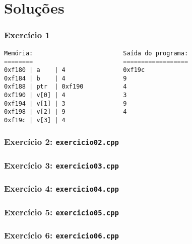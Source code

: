 \documentclass[aspectratio=169]{beamer}
\begin{document}
\section{Soluções}

\begin{frame}[fragile]\frametitle{Exercício 1}
\begin{lstlisting}[language={}]
Memória:                         Saída do programa:
========                         ==================
0xf180 | a    | 4                0xf19c
0xf184 | b    | 4                9
0xf188 | ptr  | 0xf190           4
0xf190 | v[0] | 4                3
0xf194 | v[1] | 3                9
0xf198 | v[2] | 9                4
0xf19c | v[3] | 4
\end{lstlisting}
\end{frame}

\begin{frame}[fragile]\frametitle{Exercício 2: \texttt{exercicio02.cpp}}
\fontsize{5pt}{5pt}\selectfont{

}
\end{frame}

\begin{frame}[fragile]\frametitle{Exercício 3: \texttt{exercicio03.cpp}}

\end{frame}

\begin{frame}[fragile]\frametitle{Exercício 4: \texttt{exercicio04.cpp}}

\end{frame}

\begin{frame}[fragile]\frametitle{Exercício 5: \texttt{exercicio05.cpp}}

\end{frame}

\begin{frame}[fragile]\frametitle{Exercício 6: \texttt{exercicio06.cpp}}

\end{frame}

\end{document}
